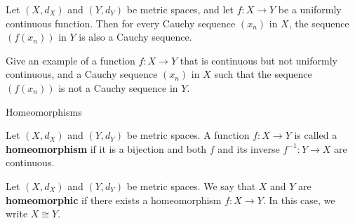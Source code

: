 \documentclass[12pt, a4paper]{article}
\begin{document}
\clearpage

\begin{theorem}
    Let $(X, d_X)$ and $(Y, d_Y)$ be metric spaces, and let $f : X \to Y$ be a uniformly continuous function. Then for every Cauchy sequence $(x_n)$ in $X$, the sequence $(f(x_n))$ in $Y$ is also a Cauchy sequence.
\end{theorem}

\clearpage

\begin{problem}
    Give an example of a function $f : X \to Y$ that is continuous but not uniformly continuous, and a Cauchy sequence $(x_n)$ in $X$ such that the sequence $(f(x_n))$ is not a Cauchy sequence in $Y$.
\end{problem}

\clearpage

\begin{heading}
    Homeomorphisms
\end{heading}

\vspace{10pt}

\begin{definition}[Homeomorphism]
    Let $(X, d_X)$ and $(Y, d_Y)$ be metric spaces. A function $f : X \to Y$ is called a \textbf{homeomorphism} if it is a bijection and both $f$ and its inverse $f^{-1} : Y \to X$ are continuous.
\end{definition}

\vspace{10pt}

\begin{definition}
    Let $(X, d_X)$ and $(Y, d_Y)$ be metric spaces. We say that $X$ and $Y$ are \textbf{homeomorphic} if there exists a homeomorphism $f : X \to Y$. In this case, we write $X \cong Y$.
\end{definition}





\EndPage
\end{document}
